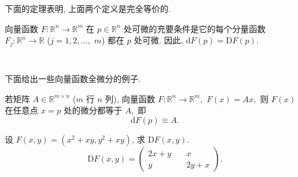 下面的定理表明, 上面两个定义是完全等价的. 

\begin{theorem}{}
向量函数 $F:\mathbb{R}^{n}\rightarrow\mathbb{R}^{m}$ 在 $p\in\mathbb{R}^{n}$
处可微的充要条件是它的每个分量函数 $F_{j}:\mathbb{R}^{n}\rightarrow\mathbb{R}$ ($j=1,2,\ldots,$ $m$)
都在 $p$ 处可微. 因此, $\mathrm{d}F(p)=\mathrm{D}F(p).$
\end{theorem}
\verb| |

下面给出一些向量函数全微分的例子.
\begin{example}{}
若矩阵 $A\in\mathbb{R}^{m\times n}$ ($m$ 行 $n$ 列), 向量函数 $F:\mathbb{R}^{n}\rightarrow\mathbb{R}^{m},$
$F(x)=Ax,$ 则 $F(x)$ 在任意点 $x=p$ 处的微分都等于 $A,$ 即
\[
\mathrm{d}F(p)\equiv A.
\]
\end{example}

\begin{example}{}
设 $F(x,y)=(x^{2}+xy,y^{2}+xy)$, 求 $\mathrm{D}F(x,y).$
$$
\mathrm{D}F(x,y)=\left(\begin{array}{cc}
2x+y\quad & x\\
y & 2y+x
\end{array}\right).
$$
\end{example}

